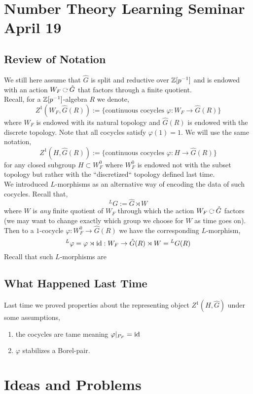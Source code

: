 \documentclass[12pt]{article}
\begin{document}
\section{Number Theory Learning Seminar April 19}

\subsection{Review of Notation}

We still here assume that $\hat{G}$ is split and reductive over $\mathbb{Z}[p^{-1}]$ and is endowed with an action $W_F \acts \hat{G}$ that factors through a finite quotient. 
\bigskip\\
Recall, for a $\mathbb{Z}[p^{-1}]$-algebra $R$ we denote,
\[ Z^1(W_F, \hat{G}(R)) := \{ \text{continuous cocycles } \varphi : W_F \to \hat{G}(R) \} \]
where $W_F$ is endowed with its natural topology and $\hat{G}(R)$ is endowed with the discrete topology. Note that all cocycles satisfy $\varphi(1) = 1$. We will use the same notation,
\[ Z^1(H, \hat{G}(R)) := \{ \text{continuous cocycles } \varphi : H \to \hat{G}(R) \} \]
for any closed subgroup $H \subset W^0_F$ where $W^0_F$ is endowed not with the subset topology but rather with the ``discretized`` topology defined last time. 
\bigskip\\
We introduced $L$-morphisms as an alternative way of encoding the data of such cocycles. Recall that,
\[ {}^L G := \hat{G} \rtimes W \]
where $W$ is \textit{any} finite quotient of $W_F$ through which the action $W_F \acts \hat{G}$ factors (we may want to change exactly which group we choose for $W$ as time goes on). Then to a $1$-cocycle $\varphi : W_F^0 \to \hat{G}(R)$ we have the corresponding $L$-morphism,
\[ {}^L \varphi = \varphi \rtimes \mathrm{id} : W_F \to \hat{G}(R) \rtimes W = {}^L G(R) \]
Recall that such $L$-morphisms are 

\subsection{What Happened Last Time}

Last time we proved properties about the representing object $Z^1(H, \hat{G})$ under some assumptions,
\begin{enumerate}
\item the cocycles are tame meaning $\varphi|_{P_F} = \mathrm{id}$
\item $\varphi$ stabilizes a Borel-pair.  
\end{enumerate}


\section{Ideas and Problems}
\end{document}
